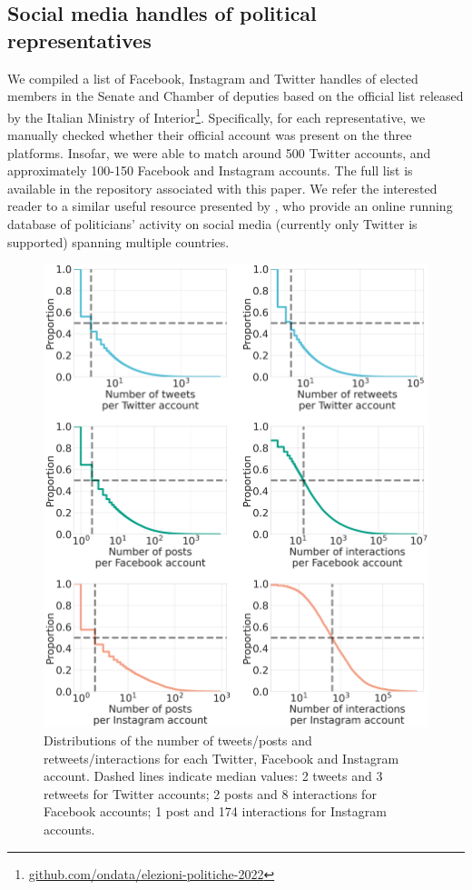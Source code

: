 \documentclass[letterpaper]{article} %
\begin{document}
\subsection{Social media handles of political representatives}
We compiled a list of Facebook, Instagram and Twitter handles of elected members in the Senate and Chamber of deputies based on the official list released by the Italian Ministry of Interior\footnote{ \url{github.com/ondata/elezioni-politiche-2022}}. Specifically, for each representative, we manually checked whether their official account was present on the three platforms. Insofar, we were able to match around 500 Twitter accounts, and approximately 100-150 Facebook and Instagram accounts. The full list is available in the repository associated with this paper. We refer the interested reader to a similar useful resource presented by \cite{haman2021politicians}, who provide an online running database of politicians' activity on social media (currently only Twitter is supported) spanning multiple countries.

\begin{figure}[!t]
    \centering
    \includegraphics[width=\linewidth]{distribution.png}
    \caption{Distributions of the number of tweets/posts and retweets/interactions for each Twitter, Facebook and Instagram account. Dashed lines indicate median values: 2 tweets and 3 retweets for Twitter accounts; 2 posts and 8 interactions for Facebook accounts; 1 post and 174 interactions for Instagram accounts.}
    \label{fig:distribution}
\end{figure}
\end{document}
